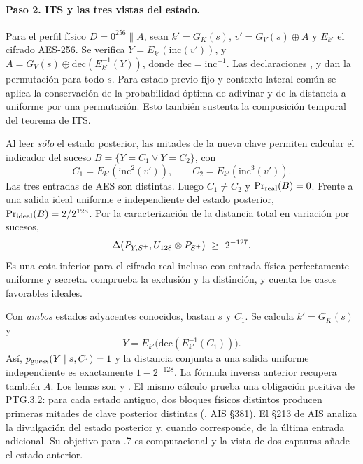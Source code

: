\paragraph{Paso 2. ITS y las tres vistas del estado.}
Para el perfil físico \(D=0^{256}\|A\), sean \(k'=G_K(s)\),
\(v'=G_V(s)\oplus A\) y \(E_{k'}\) el cifrado AES-256. Se verifica
\(Y=E_{k'}(\mathrm{inc}(v'))\), y
\(A=G_V(s)\oplus \mathrm{dec}(E_{k'}^{-1}(Y))\), donde
\(\mathrm{dec}=\mathrm{inc}^{-1}\). Las declaraciones
,  y
 dan la permutación para todo \(s\).
Para estado previo fijo y contexto lateral común se aplica la conservación
de la probabilidad óptima de adivinar y de la distancia a uniforme por una
permutación. Esto también sustenta la composición temporal del teorema de ITS.

Al leer \emph{sólo} el estado posterior, las mitades de la nueva clave
permiten calcular el indicador del suceso \(B=\{Y=C_1\lor Y=C_2\}\), con
\[
       C_1=E_{k'}(\mathrm{inc}^2(v')),\qquad
       C_2=E_{k'}(\mathrm{inc}^3(v')) .
\]
Las tres entradas de AES son distintas. Luego \(C_1\ne C_2\) y
\(\Pr_{\rm real}(B)=0\). Frente a una salida ideal uniforme e independiente
del estado posterior, \(\Pr_{\rm ideal}(B)=2/2^{128}\). Por la
caracterización de la distancia total en variación por sucesos,
\[
   \dist(P_{Y,S^+},U_{128}\otimes P_{S^+})\ \ge\ 2^{-127}.
\]
Es una cota inferior para el cifrado real incluso con entrada física
perfectamente uniforme y secreta. 
comprueba la exclusión y la distinción, y
 cuenta los casos favorables ideales.

Con \emph{ambos} estados adyacentes conocidos, bastan \(s\) y \(C_1\).
Se calcula \(k'=G_K(s)\) y
\[
              Y=E_{k'}\bigl(\mathrm{dec}(E_{k'}^{-1}(C_1))\bigr).
\]
Así, \(p_{\rm guess}(Y\mid s,C_1)=1\) y la distancia conjunta a una salida
uniforme independiente es exactamente \(1-2^{-128}\). La fórmula inversa
anterior recupera también \(A\). Los lemas son
 y
.
El mismo cálculo prueba una obligación positiva de PTG.3.2: para cada
estado antiguo, dos bloques físicos distintos producen primeras mitades de
clave posterior distintas (, AIS §381).
El §213 de AIS analiza la divulgación del estado posterior y, cuando
corresponde, de la última entrada adicional. Su objetivo para .7 es
computacional y la vista de dos capturas añade el estado anterior.

